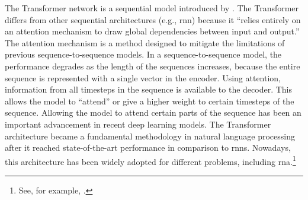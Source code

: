 

The Transformer network is a sequential model introduced by
\textcite[2]{vaswani2017attention}. The Transformer
differs from other sequential architectures (e.g.,
\gls{rnn}) because it ``relies entirely on an attention
mechanism to draw global dependencies between input and
output.'' The attention mechanism is a method designed to
mitigate the limitations of previous sequence-to-sequence
models. In a sequence-to-sequence model, the performance
degrades as the length of the sequences increases, because
the entire sequence is represented with a single vector in
the encoder. Using attention, information from all timesteps
in the sequence is available to the decoder. This allows the
model to ``attend'' or give a higher weight to certain
timesteps of the sequence. Allowing the model to attend
certain parts of the sequence has been an important
advancement in recent deep learning models. The Transformer
architecture became a fundamental methodology in natural
language processing after it reached state-of-the-art
performance in comparison to \glspl{rnn}. Nowadays, this
architecture has been widely adopted for different problems,
including \gls{rna}.\footnote{See, for example,
\textcite{chen2021attend}.}
